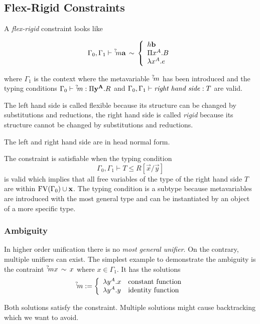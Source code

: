 \subsection{Flex-Rigid Constraints}

A \emph{flex-rigid} constraint looks like

$$
%
    \Gamma_0, \Gamma_1
%
    \vdash
%
    \meta m \vec a
%
    \equiv
%
    \cases {
        h \vec b
        \\
        \Pi x^A. B
        \\
        \lambda x^A. e
    }
$$

where $\Gamma_1$ is the context where the metavariable ${{}^? \kern-0.2em m}$ has been
introduced and the typing conditions
$\Gamma_0 \vdash {{}^? \kern-0.2em m} : \Pi {\mathbf y}^{{\mathbf A}}. R$
and
$\Gamma_0, \Gamma_1 \vdash \text{\emph{right hand side}}: T$
are valid.

The left hand side is called flexible because its structure can be changed by
substitutions and reductions, the right hand side is called \emph{rigid} because
its structure cannot be changed by substitutions and reductions.

The left and right hand side are in head normal form.


The constraint is satisfiable when the typing condition
$$
    \Gamma_0, \Gamma_1 \vdash T \le R[\vec x / \vec y]
$$
is valid which implies that all free variables of the type of the right hand side
$T$ are within ${\text{FV}}(\Gamma_0) \cup {\mathbf x}$. The typing condition is a subtype
because metavariables are introduced with the most general type and can be
instantiated by an object of a more specific type.



\subsubsection{Ambiguity}
In higher order unification there is no \emph{most general unifier}. On the
contrary, multiple unifiers can exist. The simplest example to demonstrate the
ambiguity is the contraint ${{}^? \kern-0.2em m} x \,\sim\, x$ where $x \in \Gamma_1$. It has
the solutions
$$
    {{}^? \kern-0.2em m} := \left\{ \begin{array}{lllll} 
        \lambda y^A. x & \text{constant function}
        \\
        \lambda y^A. y & \text{identity function}
     \end{array} \right.
$$

Both solutions satisfy the constraint. Multiple solutions might cause
backtracking which we want to avoid.




